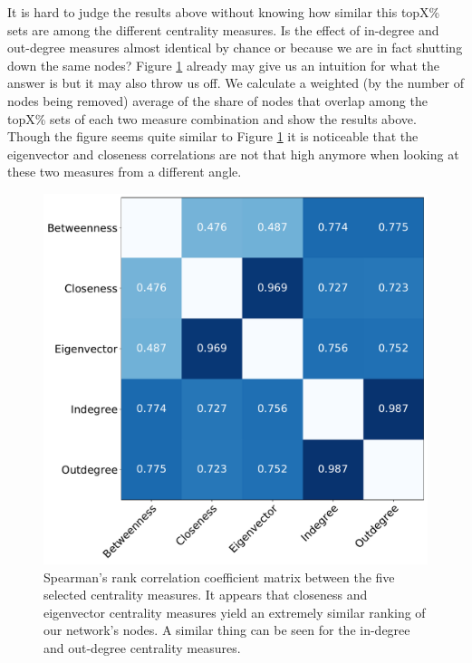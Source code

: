 \documentclass{Template resources/netsci-project}
\begin{document}
It is hard to judge the results above without knowing how similar this topX\% sets are among the different centrality measures. Is the effect of in-degree and out-degree measures almost identical by chance or because we are in fact shutting down the same nodes? Figure \ref{fig:spearman_matrix} already may give us an intuition for what the answer is but it may also throw us off. We calculate a weighted (by the number of nodes being removed) average of the share of nodes that overlap among the topX\% sets of each two measure combination and show the results above. Though the figure seems quite similar to Figure \ref{fig:spearman_matrix} it is noticeable that the eigenvector and closeness correlations are not that high anymore when looking at these two measures from a different angle.





\begin{figure}[!ht]
    \centering
    \includegraphics[width=0.5\linewidth]{Figures/spearman_matrix.pdf}
    \caption{Spearman's rank correlation coefficient matrix between the five selected centrality measures. It appears that closeness and eigenvector centrality measures yield an extremely similar ranking of our network's nodes. A similar thing can be seen for the in-degree and out-degree centrality measures.}
    \label{fig:spearman_matrix}  
\end{figure}
\end{document}
